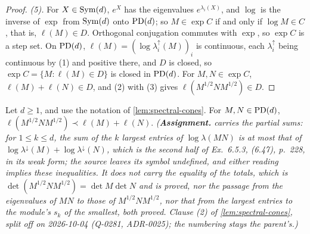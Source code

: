 \begin{proof}
\emph{(5).} For $X \in \mathrm{Sym}(d)$, $e^X$ has the eigenvalues $e^{\lambda_i(X)}$, and $\log$ is the inverse of
$\exp$ from $\mathrm{Sym}(d)$ onto $\mathrm{PD}(d)$; so $M \in \exp C$ if and only if $\log M \in C$, that is,
$\ell(M) \in D$. Orthogonal conjugation commutes with $\exp$, so $\exp C$ is a step set. On $\mathrm{PD}(d)$,
$\ell(M) = (\log\lambda^\uparrow_i(M))_i$ is continuous, each $\lambda^\uparrow_i$ being continuous by (1)
and positive there, and $D$ is closed, so $\exp C = \{M : \ell(M) \in D\}$ is closed in $\mathrm{PD}(d)$. For
$M, N \in \exp C$, $\ell(M) + \ell(N) \in D$, and (2) with (3) gives $\ell(M^{1/2}NM^{1/2}) \in D$.
\end{proof}

\begin{lemma}
\label{lem:spectral-cones-products}
\leanok
Let $d \ge 1$, and use the notation of \ref{lem:spectral-cones}. For $M, N \in \mathrm{PD}(d)$,
$\ell(M^{1/2}NM^{1/2}) \prec \ell(M) + \ell(N)$.
\statusA\quad{}\quad\emph{(\textbf{Assignment.}  carries the partial sums: for
$1 \le k \le d$, the sum of the $k$ largest entries of $\log\lambda(MN)$ is at most that of
$\log\lambda^\downarrow(M) + \log\lambda^\downarrow(N)$, which is the second half of
 Ex.~6.5.3, (6.47), p.~228, in its weak form; the source leaves its symbol
undefined, and either reading implies these inequalities. It does not carry the equality of the totals,
which is $\det(M^{1/2}NM^{1/2}) = \det M\det N$ and is proved, nor the passage from the eigenvalues of
$MN$ to those of $M^{1/2}NM^{1/2}$, nor that from the largest entries to the module's $s_k$ of the
smallest, both proved. Clause (2) of \ref{lem:spectral-cones}, split off on 2026-10-04 (Q-0281,
ADR-0025); the numbering stays the parent's.)}
\end{lemma}

